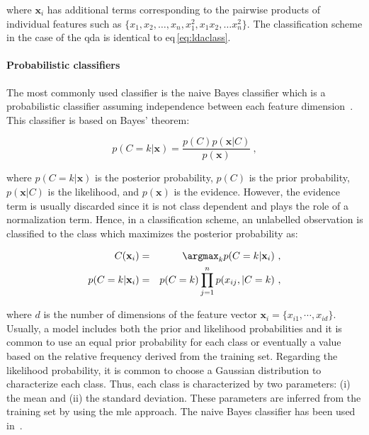 \noindent where $\mathbf{x}_i$ has additional terms corresponding to the pairwise products of individual features such as $\{x_1, x_2, \dots , x_n, x_1^2, x_1x_2, \dots x_n^2\}$.
The classification scheme in the case of the \ac{qda} is identical to \acs{eq}\,\eqref{eq:ldaclass}.

\paragraph{Probabilistic classifiers}
The most commonly used classifier is the naive Bayes classifier which is a probabilistic classifier assuming independence between each feature dimension~\cite{Rish2001}.
This classifier is based on Bayes' theorem:

\begin{equation}
	p(C=k|\mathbf{x}) = \frac{p(C)p(\mathbf{x}|C)}{p(\mathbf{x})} \ ,
	\label{eq:bayth}
\end{equation}

\noindent where $p(C=k|\mathbf{x})$ is the posterior probability, $p(C)$ is the prior probability, $p(\mathbf{x}|C)$ is the likelihood, and $p(\mathbf{x})$ is the evidence. 
However, the evidence term is usually discarded since it is not class dependent and plays the role of a normalization term.
Hence, in a classification scheme, an unlabelled observation is classified to the class which maximizes the posterior probability as:

\begin{eqnarray}
	C(\mathbf{x}_i) & = & \argmax_k p(C=k|\mathbf{x}_i) \ , \label{eq:maxbay} \\
	p(C=k|\mathbf{x}_i) & = & p(C=k) \prod_{j=1}^{n} p(x_{ij},|C=k) \ , \label{eq:postbay}
\end{eqnarray}

\noindent where $d$ is the number of dimensions of the feature vector $\mathbf{x}_i = \{x_{i1},\cdots,x_{id}\}$.
Usually, a model includes both the prior and likelihood probabilities and it is common to use an equal prior probability for each class or eventually a value based on the relative frequency derived from the training set.
Regarding the likelihood probability, it is common to choose a Gaussian distribution to characterize each class.
Thus, each class is characterized by two parameters: (i) the mean and (ii) the standard deviation.
These parameters are inferred from the training set by using the \ac{mle} approach.
The naive Bayes classifier has been used in~\cite{Giannini2013,Mazzetti2011,Niaf2011,Niaf2012,Niaf2012,cameron2014multiparametric,cameron2016maps,rampun2015classifying,rampun2016computerb,rampun2015computer,rampun2016computer}.

